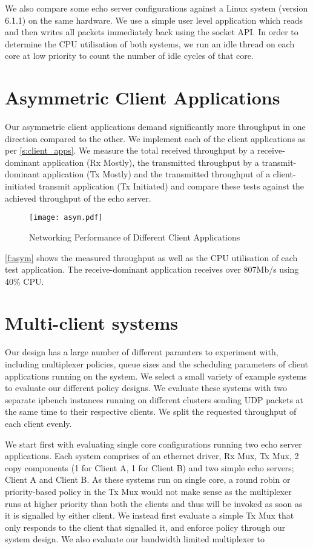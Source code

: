 We also compare some echo server configurations against a Linux system (version 6.1.1) on the same hardware. 
We use a simple user level application which reads and then writes all packets immediately back using the socket API. 
In order to determine the CPU utilisation of both systems, we run an idle thread on each core
at low priority to count the number of idle cycles of that core. 

\section{Asymmetric Client Applications}

Our asymmetric client applications demand significantly more throughput in one direction compared to the 
other. We implement each of the client applications as per \autoref{s:client_apps}.
We measure the total received throughput by a receive-dominant application (Rx Mostly), the
transmitted throughput by a transmit-dominant application (Tx Mostly) and the transmitted throughput
of a client-initiated transmit application (Tx Initiated) and compare these tests against the achieved
throughput of the echo server. 

\begin{figure}[h]
    \centering
    \texttt{[image: asym.pdf]}
    \caption{Networking Performance of Different Client Applications}
    \label{f:asym}
\end{figure}

\autoref{f:asym} shows the measured throughput as well as the CPU utilisation of each test application. The
receive-dominant application receives over 807Mb/s using 40\% CPU. 

\section{Multi-client systems}

Our design has a large number of different paramters to experiment with, including multiplexer
policies, queue sizes and the scheduling parameters of client applications running on the system. 
We select a small variety of example systems to evaluate our different policy designs. We evaluate
these systems with two separate ipbench instances running on different clusters sending UDP packets
at the same time to their respective clients. We split the requested throughput of each client evenly. 

We start first with evaluating single core configurations running two echo server applications. 
Each system comprises of an ethernet driver, Rx Mux, Tx Mux, 2 copy components (1 for Client A, 1 for Client B) 
and two simple echo servers; Client A and Client B. As these systems run on single core, a round robin or priority-based
policy in the Tx Mux would not make sense as the multiplexer runs at higher priority than both the clients and thus
will be invoked as soon as it is signalled by either client. We instead first evaluate a simple Tx Mux that only 
responds to the client that signalled it, and enforce policy through our system design. We also evaluate our
bandwidth limited multiplexer to 

